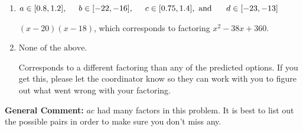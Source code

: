 \documentclass{extbook}[14pt]
\begin{document}
\begin{enumerate}
{\begin{enumerate}[label=\Alph*.]
 $(12x -5)(2x -3)$, which corresponds to associating some factor of a to c.
\item \( a \in [0.8, 1.2], \hspace*{5mm} b \in [-22, -16], \hspace*{5mm} c \in [0.75, 1.4], \text{ and } \hspace*{5mm} d \in [-23, -13] \)

 $(x -20)(x -18)$, which corresponds to factoring $x^{2} -38 x + 360$.
\item \( \text{None of the above.} \)

 Corresponds to a different factoring than any of the predicted options. If you get this, please let the coordinator know so they can work with you to figure out what went wrong with your factoring.
\end{enumerate}

\textbf{General Comment:} $ac$ had many factors in this problem. It is best to list out the possible pairs in order to make sure you don't miss any.
}
\end{enumerate}
\end{document}
